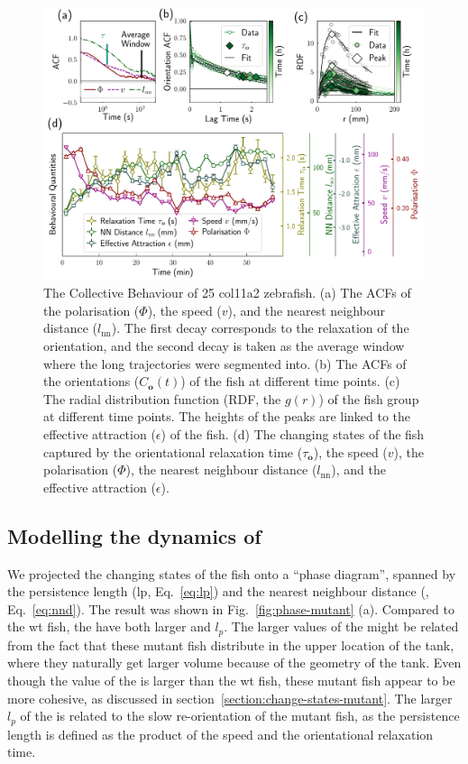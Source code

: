 \documentclass[11pt,twoside]{report}
\begin{document}
\begin{figure}
	\includegraphics[width=\linewidth]{states-col11a2}
	\caption[The changing states of 25 col11a2 zebrafish]{
        The Collective Behaviour of 25 col11a2 zebrafish.
        (a) The ACFs of the polarisation ($\Phi$), the speed ($v$), and the nearest neighbour distance ($l_\mathrm{nn}$). The first decay corresponds to the relaxation of the orientation, and the second decay is taken as the average window where the long  trajectories were segmented into.
        (b) The ACFs of the orientations ($C_\mathbf{o}(t)$) of the fish at different time points.
        (c) The radial distribution function (RDF, the $g(r)$) of the fish group at different time points. The heights of the peaks are linked to the effective attraction ($\epsilon$) of the fish.
        (d) The changing states of the fish captured by the orientational relaxation time ($\tau_\mathbf{o}$), the speed ($v$), the polarisation ($\Phi$), the nearest neighbour distance ($l_\mathrm{nn}$), and the effective attraction ($\epsilon$).
    }
\label{fig:states-col11a2}
\end{figure}

\subsection{Modelling the dynamics of {\mf}}

We projected the changing states of the fish onto a ``phase diagram'', spanned by the persistence length (\gls{lp}, Eq.~\ref{eq:lp}) and the nearest neighbour distance ({\dnn}, Eq.~\ref{eq:nnd}). The result was shown in Fig.~\ref{fig:phase-mutant} (a).
Compared to the wt fish, the {\mf} have both larger {\dnn} and $l_p$.
The larger {\dnn} values of the {\mf} might be related from the fact that these mutant fish distribute in the upper location of the tank, where they naturally get larger volume because of the geometry of the tank.
Even though the {\dnn} value of the {\mf} is larger than the wt fish, these mutant fish appear to be more cohesive, as discussed in section~\ref{section:change-states-mutant}.
The larger $l_p$ of the {\mf} is related to the slow re-orientation of the mutant fish, as the persistence length is defined as the product of the speed and the orientational relaxation time.
\end{document}
